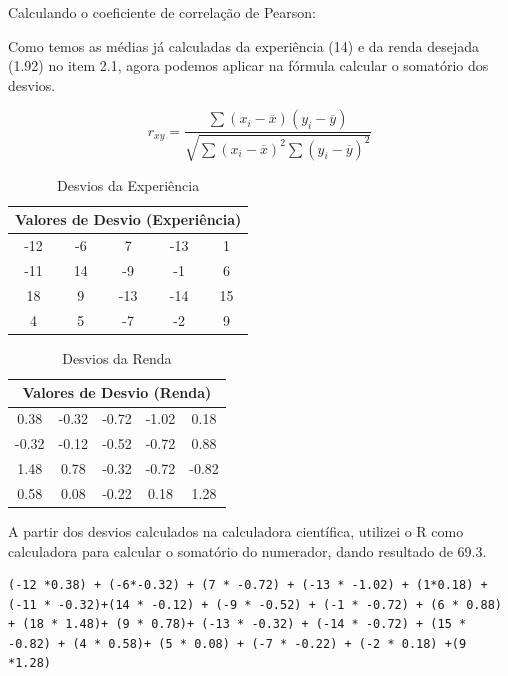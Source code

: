 \documentclass[a4paper,11pt]{article}
\begin{document}
\begin{description}[leftmargin=*]
Calculando o coeficiente de correlação
de Pearson:

Como temos as médias já calculadas da experiência (14) e da renda desejada (1.92) no item 2.1, agora podemos aplicar na fórmula calcular o somatório dos desvios.

\[r_{xy} = \frac{\sum{(x_i - \overline{x})(y_i-\overline{y})}}{\sqrt{\sum (x_i - \overline{x})^2 \sum(y_i-\overline{y})^2}}\]


\begin{table}[H]
    \centering
    \begin{tabular}{|c|c|c|c|c|}
        \hline
        \multicolumn{5}{|c|}{\textbf{Valores de Desvio (Experiência)}} \\
        \hline
        -12 & -6 & 7 & -13 & 1 \\
        -11 & 14 & -9 & -1 & 6 \\
        18 & 9 & -13 & -14 & 15 \\
        4 & 5 & -7 & -2 & 9 \\
        \hline
    \end{tabular}
    \caption{Desvios da Experiência}
    \label{tab:desvios_experiencia_h}
\end{table}

\begin{table}[H]
    \centering
    \begin{tabular}{|c|c|c|c|c|}
        \hline
        \multicolumn{5}{|c|}{\textbf{Valores de Desvio (Renda)}} \\
        \hline
        0.38 & -0.32 & -0.72 & -1.02 & 0.18 \\
        -0.32 & -0.12 & -0.52 & -0.72 & 0.88 \\
        1.48 & 0.78 & -0.32 & -0.72 & -0.82 \\
        0.58 & 0.08 & -0.22 & 0.18 & 1.28 \\
        \hline
    \end{tabular}
    \caption{Desvios da Renda }
    \label{tab:desvios_renda_h}
\end{table}

\vspace{5mm}

A partir dos desvios calculados na calculadora científica, utilizei o R como calculadora para calcular o somatório do numerador, dando resultado de 69.3.

\begin{lstlisting}
(-12 *0.38) + (-6*-0.32) + (7 * -0.72) + (-13 * -1.02) + (1*0.18) + (-11 * -0.32)+(14 * -0.12) + (-9 * -0.52) + (-1 * -0.72) + (6 * 0.88) + (18 * 1.48)+ (9 * 0.78)+ (-13 * -0.32) + (-14 * -0.72) + (15 * -0.82) + (4 * 0.58)+ (5 * 0.08) + (-7 * -0.22) + (-2 * 0.18) +(9 *1.28)


\end{lstlisting}
\end{description}
\end{document}
